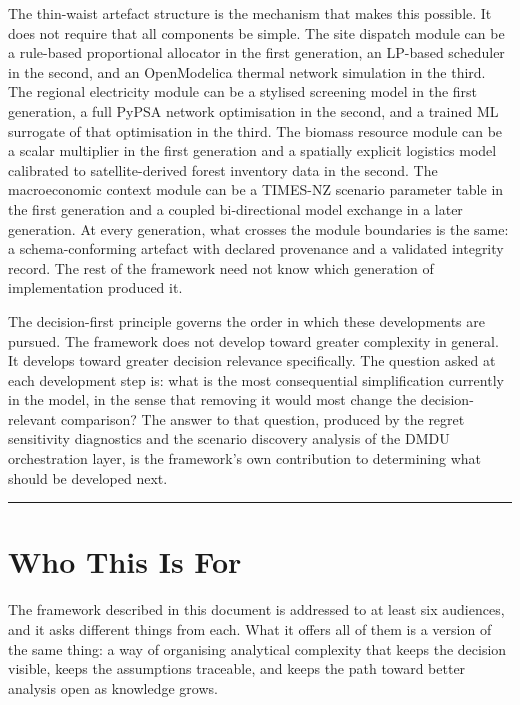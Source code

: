 \documentclass[
  11pt,
  a4paper,
  twoside,
  openright]{scrbook}
\begin{document}
The thin-waist artefact structure is the mechanism that makes this
possible. It does not require that all components be simple. The site
dispatch module can be a rule-based proportional allocator in the first
generation, an LP-based scheduler in the second, and an OpenModelica
thermal network simulation in the third. The regional electricity module
can be a stylised screening model in the first generation, a full PyPSA
network optimisation in the second, and a trained ML surrogate of that
optimisation in the third. The biomass resource module can be a scalar
multiplier in the first generation and a spatially explicit logistics
model calibrated to satellite-derived forest inventory data in the
second. The macroeconomic context module can be a TIMES-NZ scenario
parameter table in the first generation and a coupled bi-directional
model exchange in a later generation. At every generation, what crosses
the module boundaries is the same: a schema-conforming artefact with
declared provenance and a validated integrity record. The rest of the
framework need not know which generation of implementation produced it.

The decision-first principle governs the order in which these
developments are pursued. The framework does not develop toward greater
complexity in general. It develops toward greater decision relevance
specifically. The question asked at each development step is: what is
the most consequential simplification currently in the model, in the
sense that removing it would most change the decision-relevant
comparison? The answer to that question, produced by the regret
sensitivity diagnostics and the scenario discovery analysis of the DMDU
orchestration layer, is the framework's own contribution to determining
what should be developed next.

\begin{center}\rule{0.5\linewidth}{0.5pt}\end{center}

\section{Who This Is For}\label{who-this-is-for}

The framework described in this document is addressed to at least six
audiences, and it asks different things from each. What it offers all of
them is a version of the same thing: a way of organising analytical
complexity that keeps the decision visible, keeps the assumptions
traceable, and keeps the path toward better analysis open as knowledge
grows.
\end{document}

